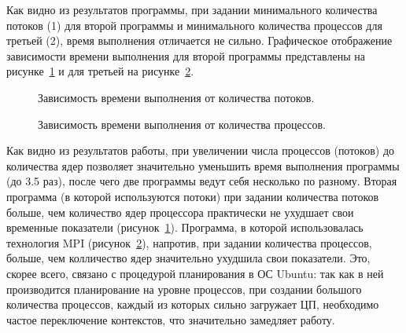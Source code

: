 \documentclass[12pt,a4paper]{report}
\begin{document}
				Как видно из результатов программы, при задании минимального количества 
				потоков (1) для второй программы и минимального количества процессов 
				для третьей (2), время выполнения отличается не сильно. Графическое 
				отображение зависимости времени выполнения для второй программы 
				представлены на рисунке~\ref{ris:threads} и для третьей на 
				рисунке~\ref{ris:mpi}.
				\begin{figure}[h]
					\caption{Зависимость времени выполнения от количества потоков.}
					\label{ris:threads}
				\end{figure}
				
				\begin{figure}[h]
					\caption{Зависимость времени выполнения от количества процессов.}
					\label{ris:mpi}
				\end{figure}
				
				Как видно из результатов работы, при увеличении числа процессов 
				(потоков) до количества ядер позволяет значительно уменьшить время 
				выполнения программы (до 3.5 раз), после чего две программы ведут себя 
				несколько по разному. Вторая программа (в которой используются потоки) 
				при задании количества потоков больше, чем количество ядер процессора 
				практически не ухудшает свои временные показатели 
				(рисунок~\ref{ris:threads}). Программа, в которой использовалась 
				технология MPI (рисунок~\ref{ris:mpi}), напротив, при задании 
				количества процессов, больше, чем колличество ядер значительно ухудшила 
				свои показатели. Это, скорее всего, связано с процедурой планирования в 
				ОС Ubuntu: так как в ней производится планирование на уровне процессов, 
				при создании большого количества процессов, каждый из которых сильно 
				загружает ЦП, необходимо частое переключение контекстов, что 
				значительно замедляет работу.
			
\end{document}
